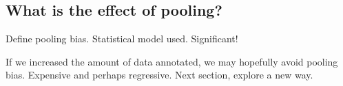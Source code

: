 \subsection{What is the effect of pooling?}

Define pooling bias. Statistical model used.
Significant!

If we increased the amount of data annotated, we may hopefully avoid pooling bias.
Expensive and perhaps regressive.
Next section, explore a new way.

